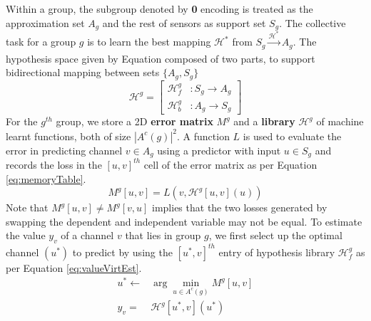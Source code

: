 Within a group, the subgroup denoted by \textbf{0} encoding is treated as the approximation set $A_g$ and the rest of sensors as support set $S_g$.
The collective task for a group $g$ is to learn the best mapping $\mathcal{H}^*$ from $S_g \xrightarrow[]{\mathcal{H}^*} A_g$.
%
The hypothesis space given by Equation  composed of two parts, to support bidirectional mapping between sets $\{A_g, S_g\}$
 \begin{equation}
  \mathcal{H}^g=\begin{bmatrix}
 \mathcal{H}^g_{f} &: S_g \rightarrow A_g  \\
 \mathcal{H}^g_{b} &: A_g \rightarrow S_g
 \end{bmatrix}
 \label{eq:recalibSet}
 \end{equation}
For the $g^{th}$ group, we store a 2D \textbf{error matrix} ${M}^g$ and a \textbf{library} $\mathcal{H}^g$ of machine learnt functions, both of size $|A^c(g)|^2$.
A function $L$ is used to evaluate the error in predicting channel $v \in A_g$ using a predictor with input $u \in S_g$ and records the loss in the $[u,v]^{th}$ cell of the error matrix as per Equation \ref{eq:memoryTable}.
\begin{equation}
M^g[u,v] = L( v, \mathcal{H}^g[u,v](u))
\label{eq:memoryTable} 
\end{equation}
Note that $M^g[u,v] \neq M^g[v,u] $ implies that the two losses generated by swapping the dependent and independent variable may not be equal.
To estimate the value $y_v$ of a channel $v$ that lies in group $g$, we first select up the optimal channel $(u^*)$ to predict by using the $[u^*, v]^{th}$ entry of hypothesis library $\mathcal{H}^g_f$ as per Equation \ref{eq:valueVirtEst}.
\begin{equation}
    \begin{matrix}
    u^* \leftarrow{}& \arg \min_{ u \in A^c(g)}  M^g[u,v] \\ 
    y_v = & \mathcal{H}^g[u^*, v](u^*) \\
    \end{matrix}
\label{eq:valueVirtEst}
\end{equation}

